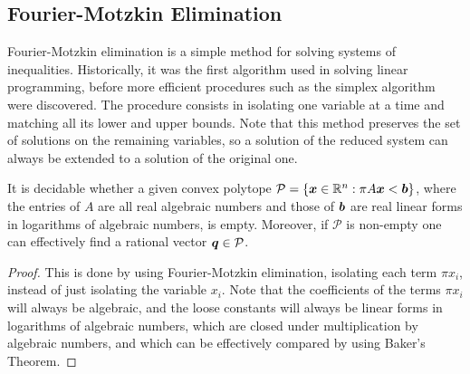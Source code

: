 \subsection{Fourier-Motzkin Elimination}

Fourier-Motzkin elimination is a simple method for solving systems of
inequalities. Historically, it was the first algorithm used in solving
linear programming, before more efficient procedures such as the
simplex algorithm were discovered. The procedure consists in isolating one
variable at a time and matching all its lower and upper bounds. Note
that this method preserves the set of solutions on the remaining
variables, so a solution of the reduced system can always be extended
to a solution of the original one.

\begin{theorem}
\label{thm:fme}
  It is decidable whether a
  given convex polytope
  $\mathcal{P} = \lbrace \boldsymbol{x} \in \mathbb{R}^{n} : \pi
  A\boldsymbol{x} < \boldsymbol{b} \rbrace$,
  where the entries of $A$ are all real algebraic numbers and
  those of $\boldsymbol{b}$ are real linear forms in logarithms of
  algebraic numbers, is empty.  Moreover, if $\mathcal{P}$ is
  non-empty one can effectively find a rational vector
  $\boldsymbol{q} \in \mathcal{P}$.
\end{theorem}

\begin{proof}
This is done by using Fourier-Motzkin elimination, isolating each term $\pi x_{i}$, instead of just isolating the variable $x_{i}$. Note that the coefficients of the terms $\pi x_{i}$ will always be algebraic, and the loose constants will always be linear forms in logarithms of algebraic numbers, which are closed under multiplication by algebraic numbers, and which can be effectively compared by using Baker's Theorem.
\end{proof}

